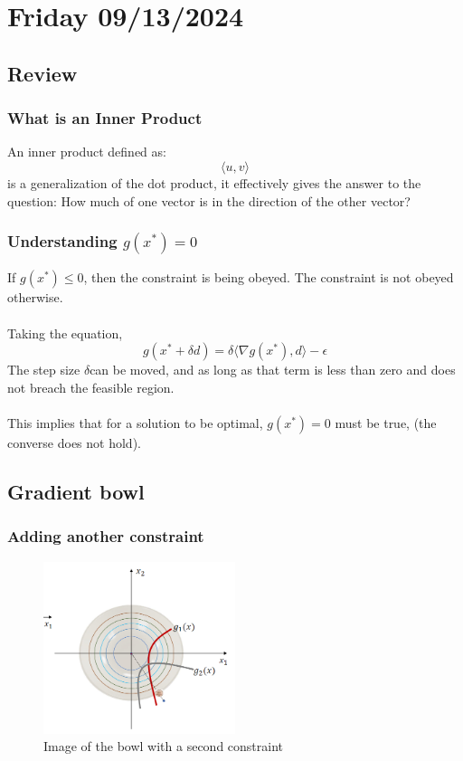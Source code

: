 \section{Friday 09/13/2024}
\subsection{Review}
\subsubsection{What is an Inner Product}
An inner product defined as:
\begin{equation}
  \langle u, v \rangle
\end{equation}
is a generalization of the dot product, it effectively gives the answer to the question: How much of one vector is in the direction of the other vector?

\subsubsection{Understanding $g(x^*)=0$}
If $g(x^*) \leq 0 $, then the constraint is being obeyed. The constraint is not obeyed otherwise.
\\ \\
Taking the equation,
\begin{equation}
  g(x^* + \delta d) = \delta \langle \nabla g(x^*), d \rangle - \epsilon
\end{equation}
The step size $\delta$can be moved, and as long as that term is less than zero and does not breach the feasible region.
\\ \\ 
This implies that for a solution to be optimal, $g(x^*) = 0$ must be true, (the converse does not hold).
\subsection{Gradient bowl}
\subsubsection{Adding another constraint}
\begin{figure}[htbp]
  \centerline{\includegraphics[width=0.50\textwidth]{images/gradient_bowl_cons2.png}}
  \caption{Image of the bowl with a second constraint}
  \label{fig:gradient_bowl_cons2}
\end{figure}

